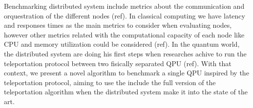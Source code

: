 
Benchmarking distributed system include metrics about the communication and orquestration of the different nodes (ref). In classical computing we have latency and responses times as the main metrics to consider when evaluating nodes, however other metrics related with the computational capacity of each node like CPU and memory utilization could be considered (ref). In the quantum world, the distributed system are doing his first steps when researches achive to run the teleportation protocol between two fisically separated QPU (ref). With that context, we present a novel algorithm to benchmark a single QPU inspired by the teleportation protocol, aiming to use the include the full version of the teleportation algorithm when the distributed system make it into the state of the art.





